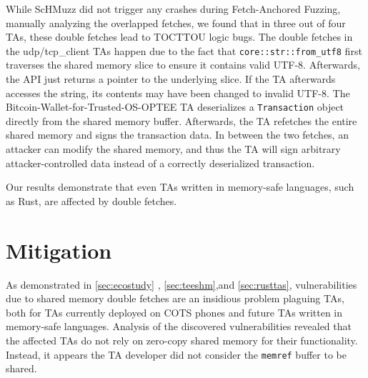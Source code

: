 \documentclass[conference]{IEEEtran} %
\newcommand{\sysname}{ScHMuzz\xspace}
\newcommand{\stagetwo}{Fetch-Anchored Fuzzing\xspace} %
\providecommand{\DIFaddtex}[1]{{\protect\color{blue} \sf #1}} %
\providecommand{\DIFaddbegin}{} %
\providecommand{\DIFaddend}{} %
\providecommand{\DIFdelbegin}{} %
\providecommand{\DIFdelend}{} %
\providecommand{\DIFadd}[1]{\texorpdfstring{\DIFaddtex{#1}}{#1}} %
\begin{document}
While \sysname did not trigger any crashes during \stagetwo, manually analyzing the 
overlapped fetches, we found that in three out of four TAs, these double fetches lead to TOCTTOU logic bugs.
The double fetches in the udp/tcp\_client TAs happen due to the fact that \texttt{core::str::from\_utf8} 
first traverses the shared memory slice to ensure it contains valid UTF-8. Afterwards, the API just 
returns a pointer to the underlying slice. If the TA afterwards accesses the string, 
its contents may have been changed to invalid UTF-8. 
The Bitcoin-Wallet-for-Trusted-OS-OPTEE TA deserializes a \texttt{Transaction} object directly from the 
shared memory buffer. Afterwards, the TA refetches the entire shared memory and signs the transaction 
data. In between the two fetches, an attacker can modify the shared memory, and thus the TA will 
sign arbitrary attacker-controlled data instead of a correctly deserialized transaction.

Our results demonstrate that even TAs written in memory-safe languages, such as Rust, are affected by double fetches. 


%
%


\section{Mitigation}\label{sec:mitigation}

As demonstrated in \DIFdelbegin %
\DIFdelend \DIFaddbegin \autoref{sec:ecostudy}\DIFadd{, \ref{sec:teeshm},and \ref{sec:rusttas}}\DIFaddend , vulnerabilities due to shared memory 
double fetches are an insidious problem plaguing TAs, both for TAs currently 
deployed on COTS phones and future TAs written in memory-safe languages.
Analysis of the discovered 
vulnerabilities revealed that the affected TAs do not rely on zero-copy shared 
memory for their functionality. Instead, it appears the TA developer did not 
consider the \texttt{memref} buffer to be shared.
\end{document}
